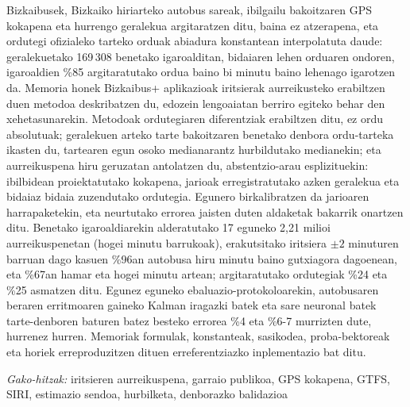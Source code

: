 \noindent Bizkaibusek, Bizkaiko hiriarteko autobus sareak, ibilgailu bakoitzaren GPS kokapena eta hurrengo geralekua
argitaratzen ditu, baina ez atzerapena, eta ordutegi ofizialeko tarteko orduak abiadura konstantean interpolatuta
daude: geralekuetako 169\,308 benetako igaroalditan, bidaiaren lehen orduaren ondoren, igaroaldien \%85 argitaratutako
ordua baino bi minutu baino lehenago igarotzen da. Memoria honek Bizkaibus+ aplikazioak iritsierak aurreikusteko
erabiltzen duen metodoa deskribatzen du, edozein lengoaiatan berriro egiteko behar den xehetasunarekin. Metodoak
ordutegiaren diferentziak erabiltzen ditu, ez ordu absolutuak; geralekuen arteko tarte bakoitzaren benetako denbora
ordu-tarteka ikasten du, tartearen egun osoko medianarantz hurbildutako medianekin; eta aurreikuspena hiru geruzatan
antolatzen du, abstentzio-arau esplizituekin: ibilbidean proiektatutako kokapena, jarioak erregistratutako azken
geralekua eta bidaiaz bidaia zuzendutako ordutegia. Egunero birkalibratzen da jarioaren harrapaketekin, eta neurtutako errorea
jaisten duten aldaketak bakarrik onartzen ditu. Benetako igaroaldiarekin alderatutako 17 eguneko 2,21 milioi
aurreikuspenetan (hogei minutu barrukoak), erakutsitako iritsiera $\pm2$ minuturen barruan dago kasuen \%96an autobusa hiru minutu baino
gutxiagora dagoenean, eta \%67an hamar eta hogei minutu artean; argitaratutako ordutegiak \%24 eta \%25 asmatzen ditu.
Egunez eguneko ebaluazio-protokoloarekin, autobusaren beraren erritmoaren gaineko Kalman iragazki batek eta sare
neuronal batek tarte-denboren baturen batez besteko errorea \%4 eta \%6-7 murrizten dute, hurrenez hurren. Memoriak formulak, konstanteak, sasikodea, proba-bektoreak
eta horiek erreproduzitzen dituen erreferentziazko inplementazio bat ditu.

\textit{Gako-hitzak:} iritsieren aurreikuspena, garraio publikoa, GPS kokapena, GTFS, SIRI, estimazio sendoa,
hurbilketa, denborazko balidazioa
